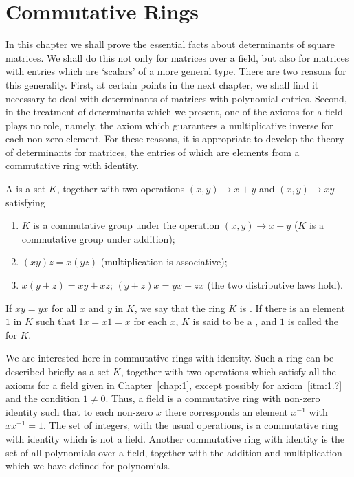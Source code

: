 \section{Commutative Rings}

In this chapter we shall prove the essential facts about determinants of square matrices. We shall do this not only for matrices over a field, but also for matrices with entries which are `scalars' of a more general type. There are two reasons for this generality. First, at certain points in the next chapter, we shall find it necessary to deal with determinants of matrices with polynomial entries. Second, in the treatment of determinants which we present, one of the axioms for a field plays no role, namely, the axiom which guarantees a multiplicative inverse for each non-zero element. For these reasons, it is appropriate to develop the theory of determinants for matrices, the entries of which are elements from a commutative ring with identity.

\begin{definition}
    A  is a set \(K\), together with two operations \(\left(x,y\right)\to x+y\) and \(\left(x,y\right)\to xy\) satisfying
    \begin{enumerate}
        \item \(K\) is a commutative group under the operation \(\left(x,y\right)\to x+y\) (\(K\) is a commutative group under addition);
        \item \(\left(xy\right)z=x\left(yz\right)\) (multiplication is associative);
        \item \(x\left(y+z\right)=xy+xz\); \(\left(y+z\right)x=yx+zx\) (the two distributive laws hold).
    \end{enumerate}
    If \(xy=yx\) for all \(x\) and \(y\) in \(K\), we say that the ring \(K\) is . If there is an element \(1\) in \(K\) such that \(1x=x1=x\) for each \(x\), \(K\) is said to be a , and \(1\) is called the  for \(K\). 
\end{definition}

We are interested here in commutative rings with identity. Such a ring can be described briefly as a set \(K\), together with two operations which satisfy all the axioms for a field given in Chapter~\ref{chap:1}, except possibly for axiom~\ref{itm:1.?} and the condition \(1\ne0\). Thus, a field is a commutative ring with non-zero identity such that to each non-zero \(x\) there corresponds an element \(x^{-1}\) with \(xx^{-1}=1\). The set of integers, with the usual operations, is a commutative ring with identity which is not a field. Another commutative ring with identity is the set of all polynomials over a field, together with the addition and multiplication which we have defined for polynomials.

